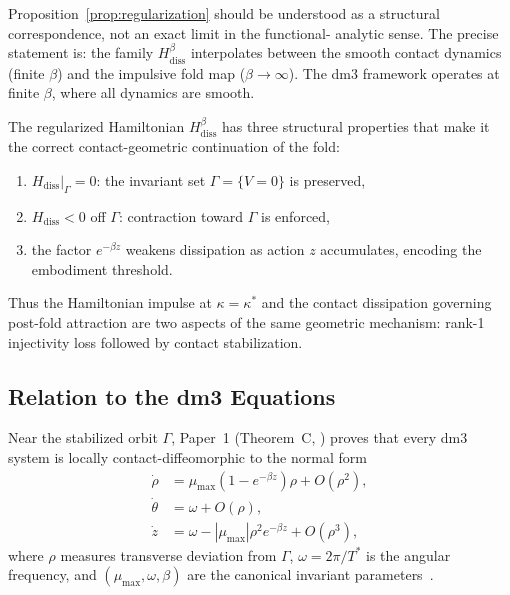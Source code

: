 \begin{remark}
Proposition~\ref{prop:regularization} should be understood as
a structural correspondence, not an exact limit in the functional-
analytic sense. The precise statement is: the family
$H_{\mathrm{diss}}^\beta$ interpolates between the smooth
contact dynamics (finite $\beta$) and the impulsive fold
map ($\beta\to\infty$). The dm3 framework operates at finite
$\beta$, where all dynamics are smooth.
\end{remark}

The regularized Hamiltonian $H_{\mathrm{diss}}^\beta$ has three
structural properties that make it the correct contact-geometric
continuation of the fold:
\begin{enumerate}[label=(\roman*)]
  \item $H_{\mathrm{diss}}|_\Gamma = 0$: the invariant set
        $\Gamma=\{V=0\}$ is preserved,
  \item $H_{\mathrm{diss}} < 0$ off $\Gamma$: contraction
        toward $\Gamma$ is enforced,
  \item the factor $e^{-\beta z}$ weakens dissipation as
        action $z$ accumulates, encoding the embodiment
        threshold.
\end{enumerate}

Thus the Hamiltonian impulse at $\kappa=\kappa^*$ and the contact
dissipation governing post-fold attraction are two aspects of the
same geometric mechanism: rank-1 injectivity loss followed by
contact stabilization.

\subsection{Relation to the dm3 Equations}
\label{subsec:dm3-relation}

Near the stabilized orbit $\Gamma$, Paper~1 (Theorem~C,
\cite{Paper1}) proves that every dm3 system is locally
contact-diffeomorphic to the normal form
\begin{align}
  \dot\rho &= \mu_{\max}(1-e^{-\beta z})\rho + O(\rho^2),
    \label{eq:nf-rho}\\
  \dot\theta &= \omega + O(\rho),
    \label{eq:nf-theta}\\
  \dot z &= \omega - |\mu_{\max}|\rho^2 e^{-\beta z} + O(\rho^3),
    \label{eq:nf-z}
\end{align}
where $\rho$ measures transverse deviation from $\Gamma$,
$\omega=2\pi/T^*$ is the angular frequency, and
$(\mu_{\max},\omega,\beta)$ are the canonical invariant
parameters~\cite{Paper1}.

